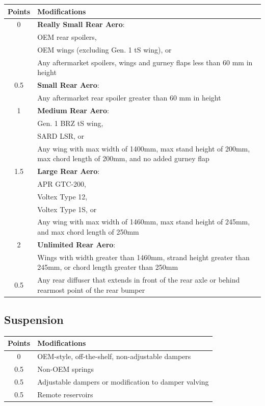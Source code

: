 \documentclass{article}
\newenvironment{legallist}{
    \begin{enumerate}[label*=\arabic*.]
}{
    \end{enumerate}
}
\newenvironment{mods}{
    \begin{longtable}{c p{6in}}
    \toprule
    \textbf{Points} & \textbf{Modifications} \\
    \midrule
}{
    \bottomrule
    \end{longtable}
}
\begin{document}
\begin{legallist}
			\begin{mods}
				0 & \textbf{Really Small Rear Aero}: \\
                & OEM rear spoilers, \\ 
                & OEM wings (excluding Gen. 1 tS wing), or \\
                & Any aftermarket spoilers, wings and gurney flaps less than 60 mm in height \\
				\midrule
				0.5 & \textbf{Small Rear Aero}: \\
                & Any aftermarket rear spoiler greater than 60 mm in height \\
				\midrule
				1 & \textbf{Medium Rear Aero}: \\
                & Gen. 1 BRZ tS wing, \\ 
                & SARD LSR, or \\
                & Any wing with max width of 1400mm, max stand height of 200mm, max chord length of 200mm, and no added gurney flap \\
				\midrule
				1.5 & \textbf{Large Rear Aero}: \\
                & APR GTC-200, \\
                & Voltex Type 12, \\ 
                & Voltex Type 1S, or \\
                & Any wing with max width of 1460mm, max stand height of 245mm, and max chord length of 250mm \\
				\midrule
				2 & \textbf{Unlimited Rear Aero}: \\
                & Wings with width greater than 1460mm, strand height greater than 245mm, or chord length greater than 250mm \\
				\midrule
				0.5 & Any rear diffuser that extends in front of the rear axle or behind rearmost point of the rear bumper \\
			\end{mods}
						
			\subsection*{Suspension}
						
			\begin{mods}
				0   & OEM-style, off-the-shelf, non-adjustable dampers \\
				\midrule
				0.5 & Non-OEM springs \\
				\midrule
				0.5 & Adjustable dampers or modification to damper valving \\
				\midrule
				0.5 & Remote reservoirs \\
			\end{mods}
						

\end{legallist}
\end{document}
